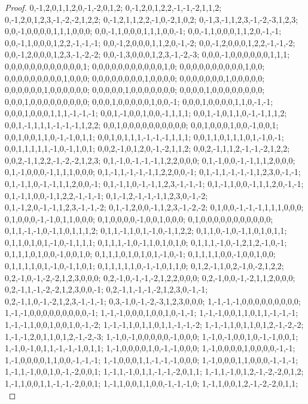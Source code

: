\documentclass{article}
\begin{document}
\begin{proof}
{{0,-1,2,0,1,1,2,0,-1,-2,0,1,2; 0,-1,2,0,1,2,2,-1,-1,-2,1,1,2; 0,-1,2,0,1,2,3,-1,-2,-2,1,2,2; 0,-1,2,1,1,2,2,-1,0,-2,1,0,2; 0,-1,3,-1,1,2,3,-1,-2,-3,1,2,3; 0,0,-1,0,0,0,0,1,1,1,0,0,0; 0,0,-1,1,0,0,0,1,1,1,0,0,-1; 0,0,-1,1,0,0,0,1,1,2,0,-1,-1; 0,0,-1,1,0,0,0,1,2,2,-1,-1,-1; 0,0,-1,2,0,0,0,1,1,2,0,-1,-2; 0,0,-1,2,0,0,0,1,2,2,-1,-1,-2; 0,0,-1,2,0,0,0,1,2,3,-1,-2,-2;
0,0,-1,3,0,0,0,1,2,3,-1,-2,-3; 0,0,0,-1,0,0,0,0,0,0,1,1,1; 0,0,0,0,0,0,0,0,0,0,0,0,1; 0,0,0,0,0,0,0,0,0,0,0,1,0; 0,0,0,0,0,0,0,0,0,0,1,0,0; 0,0,0,0,0,0,0,0,0,1,0,0,0; 0,0,0,0,0,0,0,0,1,0,0,0,0; 0,0,0,0,0,0,0,1,0,0,0,0,0; 0,0,0,0,0,0,1,0,0,0,0,0,0; 0,0,0,0,0,1,0,0,0,0,0,0,0; 0,0,0,0,1,0,0,0,0,0,0,0,0; 0,0,0,1,0,0,0,0,0,0,0,0,0;
0,0,0,1,0,0,0,0,0,1,0,0,-1; 0,0,0,1,0,0,0,0,1,1,0,-1,-1; 0,0,0,1,0,0,0,1,1,1,-1,-1,-1; 0,0,1,-1,0,0,1,0,0,-1,1,1,1; 0,0,1,-1,0,1,1,0,-1,-1,1,1,2; 0,0,1,-1,1,1,1,-1,-1,-1,1,2,2; 0,0,1,0,0,0,0,0,0,0,0,0,0; 0,0,1,0,0,0,1,0,0,-1,0,0,1; 0,0,1,0,0,1,1,0,-1,-1,0,1,1; 0,0,1,0,1,1,1,-1,-1,-1,1,1,1; 0,0,1,1,0,1,1,1,0,1,-1,0,-1; 0,0,1,1,1,1,1,-1,0,-1,1,0,1;
0,0,2,-1,0,1,2,0,-1,-2,1,1,2; 0,0,2,-1,1,1,2,-1,-1,-2,1,2,2; 0,0,2,-1,1,2,2,-1,-2,-2,1,2,3; 0,1,-1,0,-1,-1,-1,1,2,2,0,0,0; 0,1,-1,0,0,-1,-1,1,1,2,0,0,0; 0,1,-1,0,0,0,-1,1,1,1,0,0,0; 0,1,-1,1,-1,-1,-1,1,2,2,0,0,-1; 0,1,-1,1,-1,-1,-1,1,2,3,0,-1,-1; 0,1,-1,1,0,-1,-1,1,1,2,0,0,-1; 0,1,-1,1,0,-1,-1,1,2,3,-1,-1,-1; 0,1,-1,1,0,0,-1,1,1,2,0,-1,-1; 0,1,-1,1,0,0,-1,1,2,2,-1,-1,-1;
0,1,-1,2,-1,-1,-1,1,2,3,0,-1,-2; 0,1,-1,2,0,-1,-1,1,2,3,-1,-1,-2; 0,1,-1,2,0,0,-1,1,2,3,-1,-2,-2; 0,1,0,0,-1,-1,-1,1,1,1,0,0,0; 0,1,0,0,0,-1,-1,0,1,1,0,0,0; 0,1,0,0,0,0,-1,0,0,1,0,0,0; 0,1,0,0,0,0,0,0,0,0,0,0,0; 0,1,1,-1,-1,0,-1,1,0,1,1,1,2; 0,1,1,-1,1,0,1,-1,0,-1,1,2,2; 0,1,1,0,-1,0,-1,1,0,1,0,1,1; 0,1,1,0,1,0,1,-1,0,-1,1,1,1; 0,1,1,1,-1,0,-1,1,0,1,0,1,0;
0,1,1,1,-1,0,-1,2,1,2,-1,0,-1; 0,1,1,1,0,1,0,0,-1,0,0,1,0; 0,1,1,1,0,1,0,1,0,1,-1,0,-1; 0,1,1,1,1,0,0,-1,0,0,1,0,0; 0,1,1,1,1,0,1,-1,0,-1,1,0,1; 0,1,1,1,1,1,0,-1,-1,0,1,1,0; 0,1,2,-1,1,0,2,-1,0,-2,1,2,2; 0,2,-1,0,-1,-2,-2,1,2,3,0,0,0; 0,2,-1,0,-1,-1,-2,1,2,2,0,0,0; 0,2,-1,0,0,-1,-2,1,1,2,0,0,0; 0,2,-1,1,-1,-2,-2,1,2,3,0,0,-1; 0,2,-1,1,-1,-1,-2,1,2,3,0,-1,-1;
0,2,-1,1,0,-1,-2,1,2,3,-1,-1,-1; 0,3,-1,0,-1,-2,-3,1,2,3,0,0,0; 1,-1,-1,-1,0,0,0,0,0,0,0,0,0; 1,-1,-1,0,0,0,0,0,0,0,0,0,-1; 1,-1,-1,0,0,0,1,0,0,1,0,-1,-1; 1,-1,-1,0,0,1,1,0,1,1,-1,-1,-1; 1,-1,-1,1,0,0,1,0,0,1,0,-1,-2; 1,-1,-1,1,0,1,1,0,1,1,-1,-1,-2; 1,-1,-1,1,0,1,1,0,1,2,-1,-2,-2; 1,-1,-1,2,0,1,1,0,1,2,-1,-2,-3; 1,-1,0,-1,0,0,0,0,0,-1,0,0,0; 1,-1,0,-1,0,0,1,0,-1,-1,0,0,1;
1,-1,0,-1,0,1,1,-1,-1,-1,0,1,1; 1,-1,0,0,0,0,1,0,-1,-1,0,0,0; 1,-1,0,0,0,0,1,0,0,0,0,-1,-1; 1,-1,0,0,0,0,1,1,0,0,-1,-1,-1; 1,-1,0,0,0,1,1,-1,-1,-1,0,0,0; 1,-1,0,0,0,1,1,0,0,0,-1,-1,-1; 1,-1,1,-1,0,0,1,0,-1,-2,0,0,1; 1,-1,1,-1,0,1,1,-1,-1,-2,0,1,1; 1,-1,1,-1,0,1,2,-1,-2,-2,0,1,2; 1,-1,1,0,0,1,1,-1,-1,-2,0,0,1; 1,-1,1,0,0,1,1,0,0,-1,-1,-1,0; 1,-1,1,0,0,1,2,-1,-2,-2,0,1,1;
}}
\end{proof}
\end{document}
